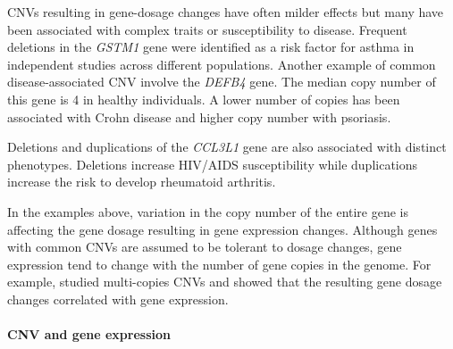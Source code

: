 CNVs resulting in gene-dosage changes have often milder effects but many have been associated with complex traits or susceptibility to disease.
Frequent deletions in the {\it GSTM1} gene were identified as a risk factor for asthma in independent studies across different populations\cite{Liang2013}.
Another example of common disease-associated CNV involve the {\it DEFB4} gene.
The median copy number of this gene is 4 in healthy individuals.
A lower number of copies has been associated with Crohn disease\cite{Fellermann2006} and higher copy number with psoriasis\cite{Hollox2008}.
\begin{comment}
  \citet{Fellermann2006} found a significantly lower copy number in this gene in a cohort of colonic Crohn's Disease and another of inflammatory bowel disease.
  Individuals with 3 copies or fewer were three times more likely to develop colonic Crohn's Disease than individuals with 4 copies or more.
  \citet{Hollox2008} observed a higher copy number in psoriasis patients in two cohorts of Dutch and German individuals.
\end{comment}
Deletions and duplications of the {\it CCL3L1} gene are also associated with distinct phenotypes.
Deletions increase HIV/AIDS susceptibility\cite{Gonzalez2005} while duplications increase the risk to develop rheumatoid arthritis\cite{McKinney2008}.
\begin{comment}
  {\it CCL3L1} is located in a segmental duplication and encodes a cytokine protein.
  The CNV status was tested with RT-PCR on 1K controls from 57 populations and 4K HIV+ and HIV- individuals.
  The same approach was performed for rheumatoid arthritis on 1K cases from NZ and UK and 1.5K controls.
\end{comment}
In the examples above, variation in the copy number of the entire gene is affecting the gene dosage resulting in gene expression changes.
Although genes with common CNVs are assumed to be tolerant to dosage changes, gene expression tend to change with the number of gene copies in the genome.
For example, \citet{Handsaker2015} studied multi-copies CNVs and showed that the resulting gene dosage changes correlated with gene expression.

\paragraph{CNV and gene expression}


